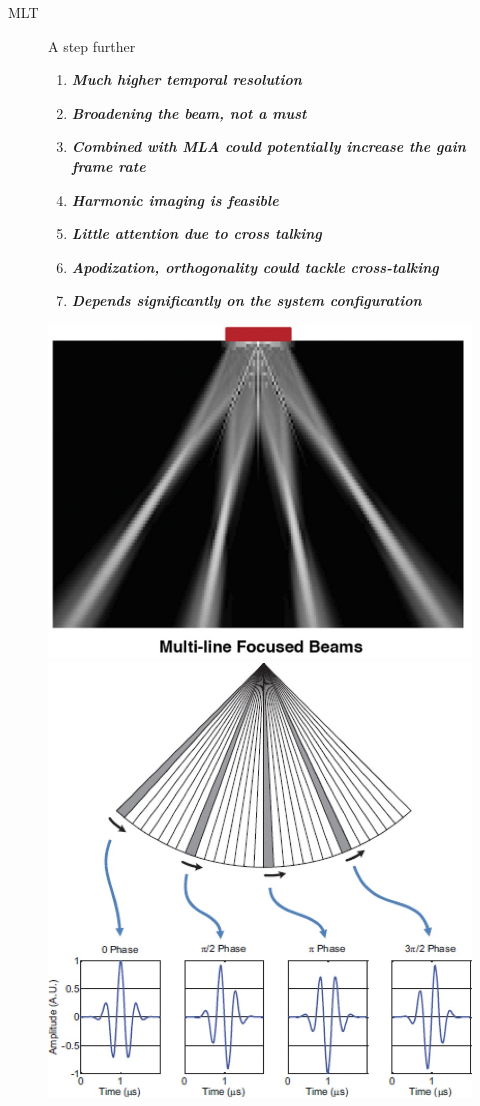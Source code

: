 \documentclass[t,12pt,english
\ifx\beamermode\undefined\else,\beamermode\fi
]{beamer}
\begin{document}
\begin{frame}{MLT}


\begin{figure}[!htb]


\begin{block}{\footnotesize{\tiny A step further \cite{6}}}\tiny{}
\begin{enumerate} 
\vspace{0.05cm}
     \item \tiny{\textbf{\textit{Much higher temporal resolution}}}
     \item \tiny{\textbf{\textit{Broadening the beam, not a must}}}
     \item \tiny{\textbf{\textit{Combined with MLA could potentially increase the gain frame rate}}}
     \item \tiny{\textbf{\textit{Harmonic imaging is feasible}}}
\color{red}
     \item \tiny{\textbf{\textit{Little attention due to cross talking}}}
      \item \tiny{\textbf{\textit{Apodization, orthogonality could tackle cross-talking}}}
      \item \tiny{\textbf{\textit{Depends significantly on the system configuration}}}
\end{enumerate}
\end{block}
\endminipage
{}
\centering
\includegraphics[width=.5\textwidth]{17.jpg}\\
\includegraphics[width=.5\textwidth]{12.jpg}\\
\endminipage
\end{figure}


\end{frame}
\end{document}
